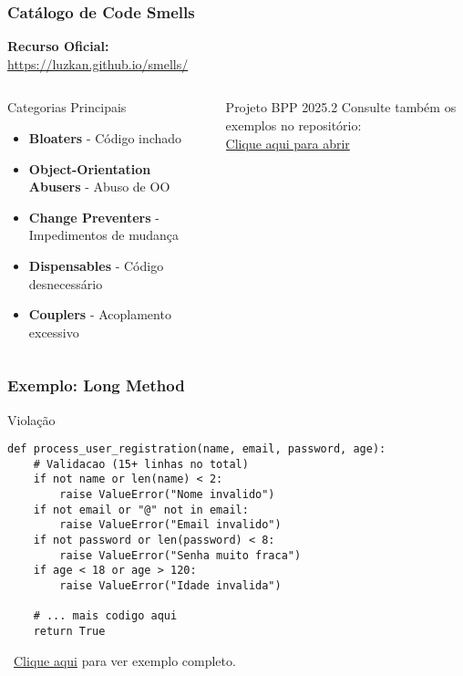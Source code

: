 \documentclass[aspectratio=169]{beamer}
\begin{document}
\begin{frame}
\frametitle{Catálogo de Code Smells}
\begin{center}
\textbf{Recurso Oficial:} \\
\vspace{0.3cm}
\Large \url{https://luzkan.github.io/smells/}
\end{center}

\vspace{0.5cm}
\begin{columns}
\begin{column}{0.5\textwidth}
\begin{block}{Categorias Principais}
\footnotesize
\begin{itemize}
    \item \textbf{Bloaters} - Código inchado
    \item \textbf{Object-Orientation Abusers} - Abuso de OO
    \item \textbf{Change Preventers} - Impedimentos de mudança
    \item \textbf{Dispensables} - Código desnecessário
    \item \textbf{Couplers} - Acoplamento excessivo
\end{itemize}
\end{block}
\end{column}

\begin{column}{0.5\textwidth}
\begin{alertblock}{Projeto BPP 2025.2}
\footnotesize
Consulte também os exemplos no repositório: \\
\vspace{0.2cm}
\href{https://github.com/fmarquesfilho/bpp-2025-2}{Clique aqui para abrir}
\end{alertblock}
\end{column}
\end{columns}
\end{frame}

\begin{frame}[fragile]
\frametitle{Exemplo: Long Method}
\begin{block}{\textcolor{cleanred}{\faTimes} Violação}
\tiny
\begin{lstlisting}
def process_user_registration(name, email, password, age):
    # Validacao (15+ linhas no total)
    if not name or len(name) < 2:
        raise ValueError("Nome invalido")
    if not email or "@" not in email:
        raise ValueError("Email invalido") 
    if not password or len(password) < 8:
        raise ValueError("Senha muito fraca")
    if age < 18 or age > 120:
        raise ValueError("Idade invalida")

    # ... mais codigo aqui
    return True
\end{lstlisting}
\end{block}

\vspace{0.1cm}
\footnotesize
\faGithub \, \href{https://github.com/fmarquesfilho/bpp-2025-2/blob/main/src/s4/problema1.py}{Clique aqui} para ver exemplo completo.
\end{frame}
\end{document}
